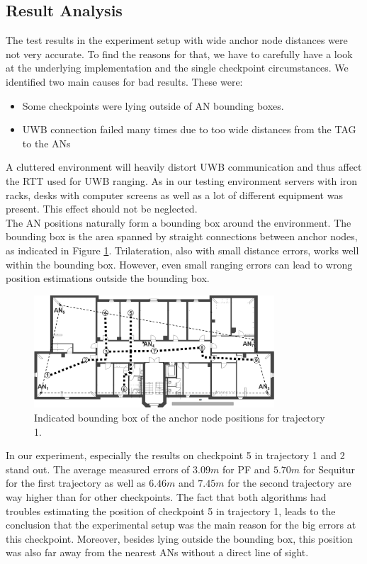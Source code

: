 \subsection{Result Analysis}
\label{Section2}
The test results in the experiment setup with wide anchor node distances were not very accurate. To find the reasons for that, we have to carefully have a look at the underlying implementation and the single checkpoint circumstances. We identified two main causes for bad results. These were:
\begin{itemize}
\item Some checkpoints were lying outside of AN bounding boxes.
\item UWB connection failed many times due to too wide distances from the TAG to the ANs
\end{itemize}
A cluttered environment will heavily distort UWB communication and thus affect the RTT used for UWB ranging. As in our testing environment servers with iron racks, desks with computer screens as well as a lot of different equipment was present. This effect should not be neglected.\\
\noindent\hspace*{5mm}%
The AN positions naturally form a bounding box around the environment. The bounding box is the area spanned by straight connections between anchor nodes, as indicated in Figure \ref{fig:trajectory1_boundingBox}. Trilateration, also with small distance errors, works well within the bounding box. However, even small ranging errors can lead to wrong position estimations outside the bounding box. 
\begin{figure}[th]
\centering
\includegraphics[width=0.8\textwidth]{Figures/trajectory1_boundingBox}
\decoRule
\caption[Bounding Box and Checkpoints for Trajectory 1 ]{Indicated bounding box of the anchor node positions for trajectory 1.}
\label{fig:trajectory1_boundingBox}
\end{figure}
In our experiment, especially the results on checkpoint 5 in trajectory 1 and 2 stand out. The average measured errors of $3.09m$ for PF and $5.70m$ for Sequitur for the first trajectory as well as $6.46m$ and $7.45m$ for the second trajectory are way higher than for other checkpoints. The fact that both algorithms had troubles estimating the position of checkpoint 5 in trajectory 1, leads to the conclusion that the experimental setup was the main reason for the big errors at this checkpoint. Moreover, besides lying outside the bounding box, this position was also far away from the nearest ANs without a direct line of sight.\\
